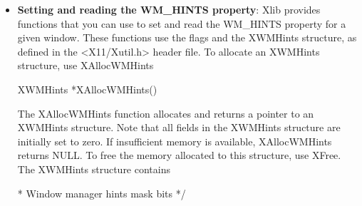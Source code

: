 \documentclass{report}
\begin{document}
\begin{itemize}
\begin{itemize}
            \bigbreak \noindent 
            \begin{cppcode}
            Status XGetIconName(Display* display, Window w, char** icon_name_return)
            \end{cppcode}
            \begin{itemize}
                \item display Specifies the connection to the X server.
                \item $w$ Specifies the window.
                \item icon\_name\_return Returns the window’s icon name, which is a null-terminated string.
            \end{itemize}
            \bigbreak \noindent 
            The XGetIconName function returns the name to be displayed in the specified window’s icon. If it succeeds, it returns a nonzero status; otherwise, if no icon name has been set for the window, it returns zero. If you never assigned a name to the window, XGetIconName sets icon\_name\_return to NULL. If the data returned by the server is in the Latin Portable Character Encoding, then the returned string is in the Host Portable Character Encoding. Otherwise, the result is implementation-dependent. When finished with it, a client must free the icon name string using XFree.
            \bigbreak \noindent 
            XGetIconName can generate a BadWindow error
        \item \textbf{Setting and reading the WM\_HINTS property}: Xlib provides functions that you can use to set and read the WM_HINTS property for a given window. These functions use the flags and the XWMHints structure, as defined in the <X11/Xutil.h> header file.
            \bigbreak \noindent 
            To allocate an XWMHints structure, use XAllocWMHints
            \bigbreak \noindent 
            \begin{cppcode}
            XWMHints *XAllocWMHints()
            \end{cppcode}
            \bigbreak \noindent 
            The XAllocWMHints function allocates and returns a pointer to an XWMHints structure. Note that all fields in the XWMHints structure are initially set to zero. If insufficient memory is available, XAllocWMHints returns NULL. To free the memory allocated to this structure, use XFree.
            \bigbreak \noindent 
            The XWMHints structure contains
            \bigbreak \noindent 
            \begin{cppcode}
                * Window manager hints mask bits */

\end{cppcode}
\end{itemize}
\end{itemize}
\end{document}
